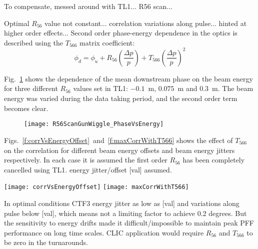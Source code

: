 To compensate, messed around with TL1... R56 scan...

Optimal \(R_{56}\) value not constant... correlation variations along pulse... 
hinted at higher order effects... Second order phase-energy dependence in the 
optics is described using the \(T_{566}\) matrix coefficient:
\begin{equation}
\phi_d = \phi_u + R_{56}\left(\frac{\Delta p}{p}\right) + 
T_{566}\left(\frac{\Delta p}{p}\right)^2
\label{e:t566}
\end{equation}


Fig.~\ref{f:R56ScanGunWiggle_PhaseVsEnergy} shows the dependence of the mean 
downstream phase on the beam energy for three different \(R_{56}\) values set 
in TL1: \(-0.1\)~m, \(0.075\)~m and \(0.3\)~m. The beam energy was varied 
during the data taking period, and the second order term becomes clear.



\begin{figure}
 \centering
  \texttt{[image: R56ScanGunWiggle\_PhaseVsEnergy]}%
  \caption{\label{f:R56ScanGunWiggle_PhaseVsEnergy}
  }
\end{figure}

Figs.~\ref{f:corrVsEnergyOffset}~and~\ref{f:maxCorrWithT566} shows the effect 
of \(T_{566}\) on the correlation for different beam energy offsets and beam 
energy jitters respectively. In each case it is assumed the first order 
\(R_{56}\) has been completely cancelled using TL1. energy jitter/offset [val] 
assumed.

\begin{figure*}
 \hfill
  \subfloat
   {
    \texttt{[image: corrVsEnergyOffset]}
    \label{f:corrVsEnergyOffset}
    }
  \subfloat
   {
    \texttt{[image: maxCorrWithT566]}
    \label{f:maxCorrWithT566}
   }
\end{figure*}

In optimal conditions CTF3 energy jitter as low as [val] and variations along 
pulse below [val], which means not a limiting factor to achieve 0.2 degrees. 
But the sensitivity to energy drifts made it difficult/impossible to maintain 
peak PFF performance on long time scales. CLIC application would require 
\(R_{56}\) and \(T_{566}\) to be zero in the turnarounds.

